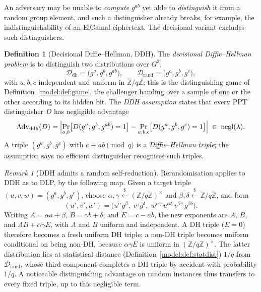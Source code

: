 \documentclass[11pt,a4paper]{article}
\theoremstyle{definition}
\newtheorem{definition}[theorem]{Definition}
\theoremstyle{remark}
\newtheorem{remark}[theorem]{Remark}
\newcommand{\Z}{\ensuremath{\mathbb{Z}}}
\DeclareMathOperator{\negl}{negl}
\begin{document}
An adversary may be unable to \emph{compute} \(g^{ab}\) yet able to
\emph{distinguish} it from a random group element, and such a
distinguisher already breaks, for example, the indistinguishability of
an ElGamal ciphertext. The decisional variant excludes such
distinguishers.

\begin{definition}[Decisional Diffie--Hellman, DDH]
\label{assumptions:def:ddh}
The \emph{decisional Diffie--Hellman problem} is to distinguish two
distributions over \(G^{3}\),
\[
\mathcal D_{\mathrm{dh}} = \bigl(g^{a}, g^{b}, g^{ab}\bigr),
\qquad
\mathcal D_{\mathrm{rand}} = \bigl(g^{a}, g^{b}, g^{c}\bigr),
\]
with \(a, b, c\) independent and uniform in \(\Z/q\Z\); this is the
distinguishing game of Definition~\ref{model:def:game}, the challenger
handing over a sample of one or the other according to its hidden bit.
The \emph{DDH assumption} states that every PPT distinguisher \(D\)
has negligible advantage
\[
\mathrm{Adv}_{\mathrm{ddh}}(D)
= \Bigl| \Pr_{a,b}\bigl[D(g^{a}, g^{b}, g^{ab}) = 1\bigr]
  - \Pr_{a,b,c}\bigl[D(g^{a}, g^{b}, g^{c}) = 1\bigr] \Bigr|
  \;\in\; \negl(\lambda).
\]
A triple \((g^{a}, g^{b}, g^{c})\) with \(c \equiv ab \pmod q\) is a
\emph{Diffie--Hellman triple}; the assumption says no efficient
distinguisher recognises such triples.
\end{definition}

\begin{remark}[DDH admits a random self-reduction]
\label{assumptions:rem:ddh-self-reducible}
Rerandomisation applies to DDH as to DLP, by the following map. Given
a target triple
\((u, v, w) = (g^{a}, g^{b}, g^{c})\), choose
\(\alpha, \gamma \xleftarrow{\$} (\Z/q\Z)^{\times}\) and
\(\beta, \delta \xleftarrow{\$} \Z/q\Z\), and form
\[
(u', v', w')
= \bigl(u^{\alpha} g^{\beta},\; v^{\gamma} g^{\delta},\;
  w^{\alpha\gamma}\, u^{\alpha\delta}\, v^{\beta\gamma}\,
  g^{\beta\delta}\bigr).
\]
Writing \(A = \alpha a + \beta\), \(B = \gamma b + \delta\), and
\(E = c - ab\), the new exponents are \(A\), \(B\), and
\(AB + \alpha\gamma E\), with \(A\) and \(B\) uniform and independent.
A DH triple (\(E = 0\)) therefore becomes a fresh uniform DH triple; a
non-DH triple becomes uniform conditional on being non-DH, because
\(\alpha\gamma E\) is uniform in \((\Z/q\Z)^{\times}\). The latter
distribution lies at statistical distance
(Definition~\ref{model:def:statdist}) \(1/q\) from
\(\mathcal D_{\mathrm{rand}}\), whose third component completes a DH
triple by accident with probability \(1/q\). A noticeable
distinguishing advantage on random instances thus transfers to every
fixed triple, up to this negligible term.
\end{remark}
\end{document}
